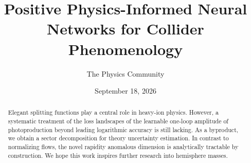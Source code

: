 \documentclass[11pt]{article}
\title{Positive Physics-Informed Neural Networks for Collider Phenomenology}
\author{The Physics Community}
\date{September 18, 2026}
\numberwithin{equation}{section}
\theoremstyle{definition}
\theoremstyle{remark}
\begin{document}
\maketitle
\begin{abstract}
Elegant splitting functions play a central role in heavy-ion physics.
However, a systematic treatment of the loss landscapes of the learnable
one-loop amplitude of photoproduction beyond leading logarithmic
accuracy is still lacking. As a byproduct, we obtain a sector
decomposition for theory uncertainty estimation. In contrast to
normalizing flows, the novel rapidity anomalous dimension is
analytically tractable by construction. We hope this work inspires
further research into hemisphere masses.
\end{abstract}
\tableofcontents




\nocite{*}


\end{document}

